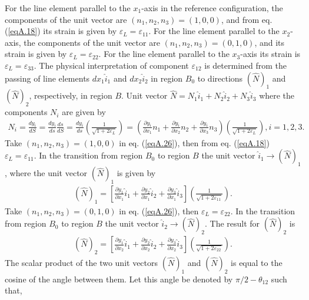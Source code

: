\documentclass{AeroStructure-ERJohnson}
\begin{document}
For the line element parallel to the $x_{1}$-axis in the reference configuration, the components of the unit vector are $(n_{1}, n_{2}, n_{3})=(1,0,0)$, and from eq. (\ref{eqA.18}) its strain is given by $\varepsilon_{L}=\varepsilon_{11}$. For the line element parallel to the $x_{2}$-axis, the components of the unit vector are $(n_{1}, n_{2}, n_{3})=(0,1,0)$, and its strain is given by $\varepsilon_{L}=\varepsilon_{22}$. For the line element parallel to the $x_{3}$-axis its strain is $\varepsilon_{L}=\varepsilon_{33}$. The physical interpretation of component $\varepsilon_{12}$ is determined from the passing of line elements $d x_{1} \hat{i}_{1}$ and $d x_{2} \hat{i}_{2}$ in region $B_{0}$ to directions $(\hat{N})_{1}$ and $(\hat{N})_{2}$, respectively, in region $B$. Unit vector $\hat{N}=N_{1} \hat{i}_{1}+N_{2} \hat{i}_{2}+N_{3} \hat{i}_{3}$ where the components $N_{i}$ are given by
\begin{align}\label{eqA.26}	
N_{i}=\frac{d y_{i}}{d S}=\frac{d y_{i}}{d s} \frac{d s}{d S}=\frac{d y_{i}}{d s}\left(\frac{1}{\sqrt{1+2 \varepsilon_{L}}}\right)=\left(\frac{\partial y_{i}}{\partial x_{1}} n_{1}+\frac{\partial y_{i}}{\partial x_{2}} n_{2}+\frac{\partial y_{i}}{\partial x_{3}} n_{3}\right)\left(\frac{1}{\sqrt{1+2 \varepsilon_{L}}}\right), i=1,2,3.
\end{align}
Take $(n_{1}, n_{2}, n_{3})=(1,0,0)$ in eq. (\ref{eqA.26}), then from eq. (\ref{eqA.18}) $\varepsilon_{L}=\varepsilon_{11}$. In the transition from region $B_{0}$ to region $B$ the unit vector $\hat{i}_{1} \rightarrow(\hat{N})_{1}$, where the unit vector $(\hat{N})_{1}$ is given by
\begin{align}\label{eqA.27}	
(\hat{N})_{1}=\left[\frac{\partial y_{1}}{\partial x_{1}} \hat{i}_{1}+\frac{\partial y_{2}}{\partial x_{1}} \hat{i}_{2}+\frac{\partial y_{3}}{\partial x_{1}} \hat{i}_{3}\right]\left(\frac{1}{\sqrt{1+2 \varepsilon_{11}}}\right).
\end{align}
Take $(n_{1}, n_{2}, n_{3})=(0,1,0)$ in eq. (\ref{eqA.26}), then $\varepsilon_{L}=\varepsilon_{22}$. In the transition from region $B_{0}$ to region $B$ the unit vector $\hat{i}_{2} \rightarrow(\hat{N})_{2}$. The result for $(\hat{N})_{2}$ is
\begin{align}\label{eqA.28}
(\hat{N})_{2}=\left[\frac{\partial y_{1}}{\partial x_{2}} \hat{i}_{1}+\frac{\partial y_{2}}{\partial x_{2}} \hat{i}_{2}+\frac{\partial y_{3}}{\partial x_{2}} \hat{i}_{3}\right]\left(\frac{1}{\sqrt{1+2 \varepsilon_{22}}}\right).
\end{align}
The scalar product of the two unit vectors $(\hat{N})_{1}$ and $(\hat{N})_{2}$ is equal to the cosine of the angle between them. Let this angle be denoted by $\pi / 2-\theta_{12}$ such that,
\end{document}
